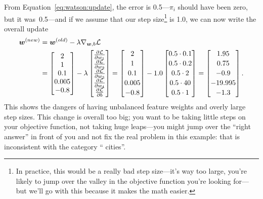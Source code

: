 From Equation~\ref{eq:watson:update}, the error is 0.5---$\pi_i$ should have
been zero, but it was~0.5---and if we assume that our step size\footnote{In practice, this would
  be a really bad step size---it's way too large, you're likely to jump over
  the valley in the objective function you're looking for---but we'll go with
  this because it makes the math easier.} is 1.0,
%
we can now write the overall update
\begin{align}
  {\bm w}^{(new)} & = {\bm w}^{(old)} - \lambda \nabla_{{\bm w}, b}
                    \mathcal{L} \\ &  = 
  \begin{bmatrix}
    2 \\
1  \\
0.1  \\
  0.005  \\
  -0.8 \\
\end{bmatrix} - \lambda  \begin{bmatrix}
\D{\mathcal{L}}{w_1}  \\
\D{\mathcal{L}}{w_2}  \\
  \D{\mathcal{L}}{w_3}  \\
  \D{\mathcal{L}}{w_4}  \\  
\D{\mathcal{L}}{b}  \\  
\end{bmatrix}
= \begin{bmatrix}
  2 \watsonvspace \\
1 \watsonvspace \\
0.1 \watsonvspace \\
  0.005 \watsonvspace \\
  -0.8 \\
\end{bmatrix} - 1.0  \begin{bmatrix}
  0.5 \cdot 0.1 \watsonvspace \\
0.5 \cdot 0.2 \watsonvspace \\
0.5 \cdot 2 \watsonvspace \\
  0.5 \cdot 40 \watsonvspace \\
  0.5 \cdot 1
\end{bmatrix} = \begin{bmatrix}
  1.95 \watsonvspace \\
0.75 \watsonvspace \\
-0.9 \watsonvspace \\
  -19.995 \watsonvspace \\
  -1.3 \nonumber \\
\end{bmatrix}.
\label{eq:watson:update-ex}
\end{align}
This shows the dangers of having unbalanced feature weights and overly large step
sizes.  This change is overall too big; you want to be taking little steps on
your objective function, not taking huge leaps---you might jump over the
``right answer'' in front of you and not fix the real problem in this example:
that  is inconsistent with the category `` cities''.

